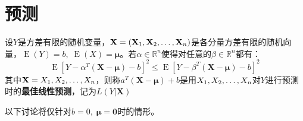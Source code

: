 \section{预测}

\begin{definition}
	设$Y$是方差有限的随机变量，$\mathbf{X}=(\mathbf{X}_1, \mathbf{X}_2, \dots, \mathbf{X}_{n})$是各分量方差有限的随机向量，$\operatorname{E}(Y)=b,\;\operatorname{E}(X)=\boldsymbol{\mu}$。若$\alpha\in\mathbb{R}^{n}$使得对任意的$\beta\in\mathbb{R}^{n}$都有：
	\begin{equation*}
		\operatorname{E}[Y-\alpha^T(\mathbf{X}-\boldsymbol{\mu})-b]^2\leqslant\operatorname{E}[Y-\beta^T(\mathbf{X}-\boldsymbol{\mu})-b]^2
	\end{equation*}
	其中$\mathbf{X}=X_1, X_2, \dots, X_{n}$，则称$a^T(\mathbf{X}-\boldsymbol{\mu})+b$是用$X_1, X_2, \dots, X_{n}$对$Y$进行预测时的\textbf{最佳线性预测}，记为$L(Y|\mathbf{X})$
\end{definition}
以下讨论将仅针对$b=0,\;\boldsymbol{\mu}=\mathbf{0}$时的情形。